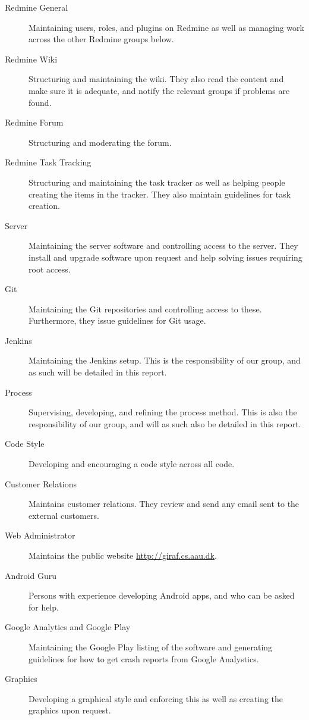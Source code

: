 \begin{description}
  \item[Redmine General] Maintaining users, roles, and plugins on Redmine as well as managing work across the other Redmine groups below.
  \item[Redmine Wiki] Structuring and maintaining the wiki. They also read the content and make sure it is adequate, and notify the relevant groups if problems are found.
  \item[Redmine Forum] Structuring and moderating the forum.
  \item[Redmine Task Tracking] Structuring and maintaining the task tracker as well as helping people creating the items in the tracker. They also maintain guidelines for task creation.
  \item[Server] Maintaining the server software and controlling access to the server. They install and upgrade software upon request and help solving issues requiring root access.
  \item[Git] Maintaining the Git repositories and controlling access to these. Furthermore, they issue guidelines for Git usage.
  \item[Jenkins] Maintaining the Jenkins setup. This is the responsibility of our group, and as such will be detailed in this report.
  \item[Process] Supervising, developing, and refining the process method. This is also the responsibility of our group, and will as such also be detailed in this report.
  \item[Code Style] Developing and encouraging a code style across all code.
  \item[Customer Relations] Maintains customer relations. They review and send any email sent to the external customers.
  \item[Web Administrator] Maintains the public website \url{http://giraf.cs.aau.dk}.
  \item[Android Guru] Persons with experience developing Android apps, and who can be asked for help.
  \item[Google Analytics and Google Play] Maintaining the Google Play listing of the software and generating guidelines for how to get crash reports from Google Analystics.
  \item[Graphics] Developing a graphical style and enforcing this as well as creating the graphics upon request.
\end{description}